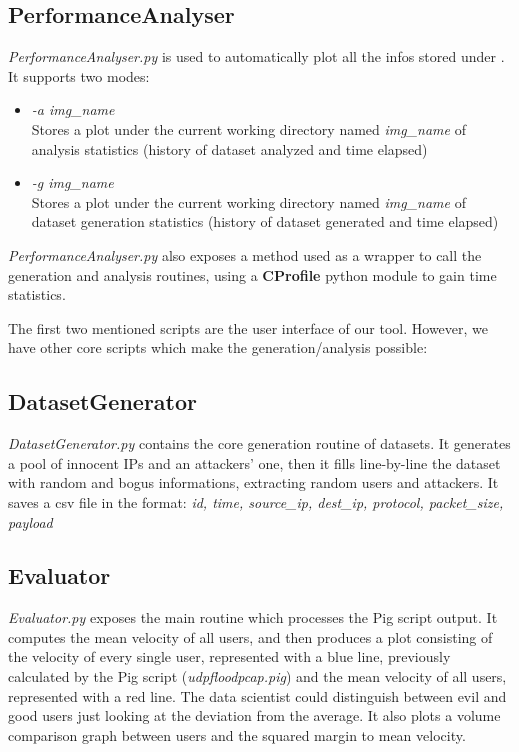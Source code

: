 \subsection{PerformanceAnalyser}
\textit{PerformanceAnalyser.py} is used to automatically plot all the infos stored under . It supports two modes:
	\begin{itemize}
		\item \textit{-a img\_name} \\ Stores a plot under the current working directory named \textit{img\_name} of analysis statistics (history of dataset analyzed and time elapsed)
		\item \textit{-g img\_name} \\ Stores a plot under the current working directory named \textit{img\_name} of dataset generation statistics (history of dataset generated and time elapsed)
	\end{itemize}

\textit{PerformanceAnalyser.py} also exposes a method used as a wrapper to call the generation and analysis routines, using a \textbf{CProfile} python module to gain time statistics.

\bigskip
The first two mentioned scripts are the user interface of our tool. However, we have other core scripts which make the generation/analysis possible:

\subsection{DatasetGenerator}
\textit{DatasetGenerator.py} contains the core generation routine of datasets. It generates a pool of innocent IPs and an attackers' one, then it fills line-by-line the dataset with random and bogus informations, extracting random users and attackers. It saves a csv file in the format: \textit{id, time, source\_ip, dest\_ip, protocol, packet\_size, payload}

\subsection{Evaluator} 
\textit{Evaluator.py} exposes the main routine which processes the Pig script output. It computes the mean velocity of all users, and then produces a plot consisting of the velocity of every single user, represented with a blue line, previously calculated by the Pig script (\textit{udpfloodpcap.pig}) and the mean velocity of all users, represented with a red line. The data scientist could distinguish between evil and good users just looking at the deviation from the average. It also plots a volume comparison graph between users and the squared margin to mean velocity.


